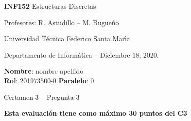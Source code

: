 \documentclass[letterpaper,10pt]{article}
\begin{document}
\thispagestyle{empty}

\begin{minipage}[t]{0.6\textwidth}

{\LARGE \textbf{INF152} Estructuras Discretas}

{\large Profesores: R. Astudillo -- M. Bugueño}

Universidad T\'ecnica Federico Santa Mar\'{\i}a

Departamento de Inform\'atica -- Diciembre 18, 2020.

\end{minipage}
\hfill
\begin{minipage}[t]{0.35\textwidth}
\textbf{Nombre}: nombre apellido\\[0.3cm]
\textbf{Rol}: 201973500-0 \textbf{Paralelo}: 0
\end{minipage}

\vspace{0.8cm}

{\Large Certamen 3 -- Pregunta 3}

\vspace{0.4cm}

\textbf{Esta evaluación tiene como máximo 30 puntos del C3}
\end{document}
